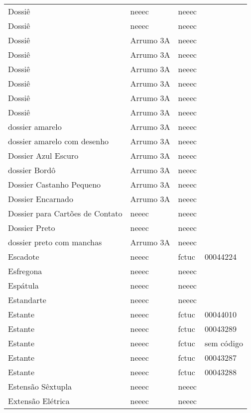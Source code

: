 \begin{longtable}{Xlll}
Dossiê & \acrshort{neeec} & \acrshort{neeec} & \\
Dossiê & \acrshort{neeec} & \acrshort{neeec} & \\
Dossiê & Arrumo 3A & \acrshort{neeec} & \\
Dossiê & Arrumo 3A & \acrshort{neeec} & \\
Dossiê & Arrumo 3A & \acrshort{neeec} & \\
Dossiê & Arrumo 3A & \acrshort{neeec} & \\
Dossiê & Arrumo 3A & \acrshort{neeec} & \\
Dossiê & Arrumo 3A & \acrshort{neeec} & \\
dossier amarelo & Arrumo 3A & \acrshort{neeec} & \\
dossier amarelo com desenho & Arrumo 3A & \acrshort{neeec} & \\
Dossier Azul Escuro & Arrumo 3A & \acrshort{neeec} & \\
dossier Bordô & Arrumo 3A & \acrshort{neeec} & \\
Dossier Castanho Pequeno & Arrumo 3A & \acrshort{neeec} & \\
Dossier Encarnado & Arrumo 3A & \acrshort{neeec} & \\
Dossier para Cartões de Contato & \acrshort{neeec} & \acrshort{neeec} & \\
Dossier Preto & \acrshort{neeec} & \acrshort{neeec} & \\
dossier preto com manchas & Arrumo 3A & \acrshort{neeec} & \\
Escadote & \acrshort{neeec} & \acrshort{fctuc} & 00044224\\
Esfregona & \acrshort{neeec} & \acrshort{neeec} & \\
Espátula & \acrshort{neeec} & \acrshort{neeec} & \\
Estandarte & \acrshort{neeec} & \acrshort{neeec} & \\
Estante & \acrshort{neeec} & \acrshort{fctuc} & 00044010\\
Estante & \acrshort{neeec} & \acrshort{fctuc} & 00043289\\
Estante & \acrshort{neeec} & \acrshort{fctuc} & sem código\\
Estante & \acrshort{neeec} & \acrshort{fctuc} & 00043287\\
Estante & \acrshort{neeec} & \acrshort{fctuc} & 00043288\\
Estensão Sêxtupla & \acrshort{neeec} & \acrshort{neeec} & \\
Extensão Elétrica & \acrshort{neeec} & \acrshort{neeec} & \\

\end{longtable}
